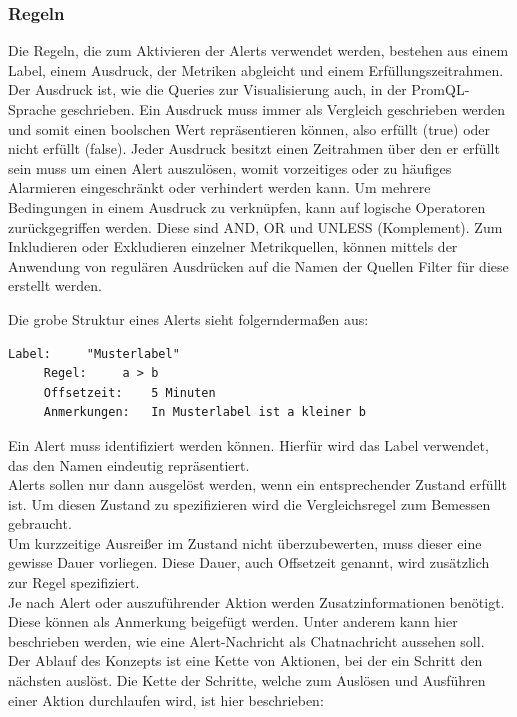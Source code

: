 \documentclass[a4paper,10pt]{scrartcl}
\begin{document}
\subsubsection{Regeln}

Die Regeln, die zum Aktivieren der Alerts verwendet werden, bestehen aus einem Label, einem Ausdruck, der Metriken abgleicht und einem Erfüllungszeitrahmen.
Der Ausdruck ist, wie die Queries zur Visualisierung auch, in der PromQL-Sprache geschrieben. Ein Ausdruck muss immer als Vergleich geschrieben werden und somit einen boolschen Wert repräsentieren können, also erfüllt (true) oder nicht erfüllt (false).
Jeder Ausdruck besitzt einen Zeitrahmen über den er erfüllt sein muss um einen Alert auszulösen, womit vorzeitiges oder zu häufiges Alarmieren eingeschränkt oder verhindert werden kann.
Um mehrere Bedingungen in einem Ausdruck zu verknüpfen, kann auf logische Operatoren zurückgegriffen werden. Diese sind AND, OR und UNLESS (Komplement).
Zum Inkludieren oder Exkludieren einzelner Metrikquellen, können mittels der Anwendung von regulären Ausdrücken auf die Namen der Quellen Filter für diese erstellt werden.

Die grobe Struktur eines Alerts sieht folgerndermaßen aus:\\

\begin{lstlisting}[basicstyle=\footnotesize]
     Label:		"Musterlabel"
     Regel:		a > b
     Offsetzeit:	5 Minuten
     Anmerkungen:	In Musterlabel ist a kleiner b
\end{lstlisting}

Ein Alert muss identifiziert werden können. Hierfür wird das Label verwendet, das den Namen eindeutig repräsentiert.\\
Alerts sollen nur dann ausgelöst werden, wenn ein entsprechender Zustand erfüllt ist. Um diesen Zustand zu spezifizieren wird die Vergleichsregel zum Bemessen gebraucht.\\
Um kurzzeitige Ausreißer im Zustand nicht überzubewerten, muss dieser eine gewisse Dauer vorliegen. Diese Dauer, auch Offsetzeit genannt, wird zusätzlich zur Regel spezifiziert.\\
Je nach Alert oder auszuführender Aktion werden Zusatzinformationen benötigt. Diese können als Anmerkung beigefügt werden. Unter anderem kann hier beschrieben werden, wie eine Alert-Nachricht als Chatnachricht aussehen soll.\\

Der Ablauf des Konzepts ist eine Kette von Aktionen, bei der ein Schritt den nächsten auslöst. Die Kette der Schritte, welche zum Auslösen und Ausführen einer Aktion durchlaufen wird, ist hier beschrieben:\\
\end{document}
